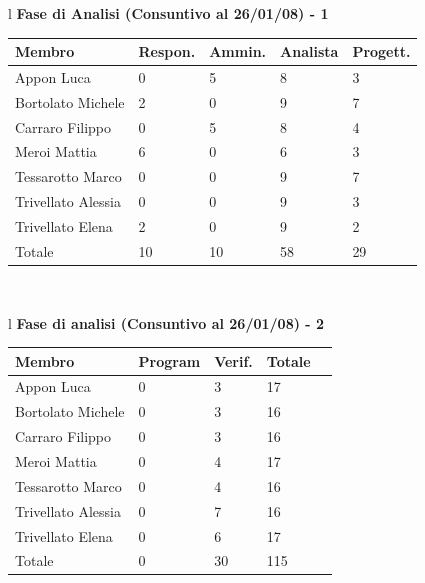 \documentclass[11pt,titlepage,a4paper]{report}
\begin{document}
\begin{table}[hbtp]
\large{
\begin{tabular}{l}
\Large{\textbf{\textsf{Fase di Analisi (Consuntivo al 26/01/08) - 1}}} \\
\begin{tabular}{||p{3.5cm}||p{2cm}||p{2cm}||p{2cm}||p{2cm}||}
\hline
\textbf{Membro} & \textbf{Respon.} & \textbf{Ammin.} & \textbf{Analista}
& \textbf{Progett.}\\ \hline
{Appon Luca}&0&5&8&3 \\ \hline 
{Bortolato Michele} &2&0&9&7\\ \hline
{Carraro Filippo}&0&5&8&4 \\ \hline
{Meroi Mattia}&6&0&6&3\\ \hline
{Tessarotto Marco} &0&0&9&7\\ \hline
{Trivellato Alessia} &0&0&9&3 \\ \hline
{Trivellato Elena} &2&0&9&2 \\ \hline
{Totale}& 10&10&58&29 \\ \hline
\end{tabular} \\
\end{tabular}
}
\end{table}

\begin{table}[hbtp]
\large{
\begin{tabular}{l}
\Large{\textbf{\textsf{Fase di analisi (Consuntivo al 26/01/08) - 2}}} \\
\begin{tabular}{||p{3.5cm}||p{2cm}||p{2cm}||p{2cm}||p{2cm}||}
\hline
\textbf{Membro} & \textbf{Program} & \textbf{Verif.} & \textbf{Totale}\\ \hline
{Appon Luca}&0&3&17 \\ \hline 
{Bortolato Michele} &0&3&16\\ \hline
{Carraro Filippo}&0&3&16 \\ \hline
{Meroi Mattia}&0&4&17\\ \hline
{Tessarotto Marco} &0&4&16\\ \hline
{Trivellato Alessia} &0&7&16 \\ \hline
{Trivellato Elena} &0&6&17 \\ \hline
{Totale} &0&30&115 \\ \hline
\end{tabular} \\
\end{tabular}
}
\end{table}
\end{document}
